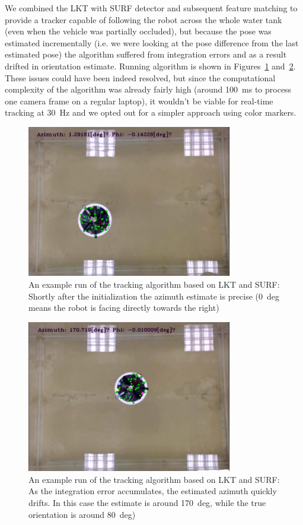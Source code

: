 We combined the LKT with SURF detector and subsequent feature matching to provide a tracker capable of following the robot across the whole water tank (even when the vehicle was partially occluded), but because the pose was estimated incrementally (i.e. we were looking at the pose difference from the last estimated pose) the algorithm suffered from integration errors and as a result drifted in orientation estimate. Running algorithm is shown in Figures~\ref{fig:surf1} and~\ref{fig:surf2}. These issues could have been indeed resolved, but since the computational complexity of the algorithm was already fairly high (around 100~ms to process one camera frame on a regular laptop), it wouldn't be viable for real-time tracking at 30~Hz and we opted out for a simpler approach using color markers. 


\begin{figure}
\centering
\includegraphics[width=0.8\textwidth]{Files/Figures/surf1.png}
\caption[Robot tracking - initialization]{An example run of the tracking algorithm based on LKT and SURF: Shortly after the initialization the azimuth estimate is precise (0~deg means the robot is facing directly towards the right)}
\label{fig:surf1}
\end{figure}

\begin{figure}
\centering
\includegraphics[width=0.8\textwidth]{Files/Figures/surf2.png}
\caption[Robot tracking - orientation drift]{An example run of the tracking algorithm based on LKT and SURF: As the integration error accumulates, the estimated azimuth quickly drifts. In this case the estimate is around 170~deg, while the true orientation is around 80~deg)}
\label{fig:surf2}
\end{figure}


